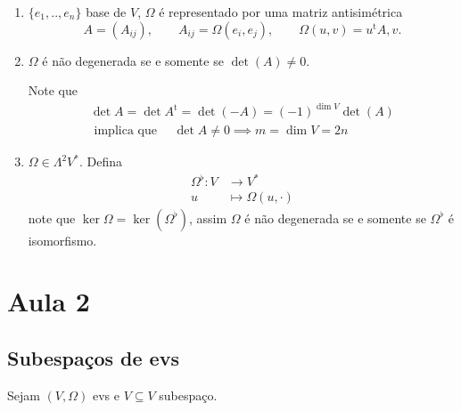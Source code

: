 \begin{remark}\leavevmode 
	\begin{enumerate}
		\item $\{e_1,..,e_{n}\} $ base de $V$, $\Omega$ \'e representado por uma matriz antisim\'etrica
	\[A=(A_{ij}),\qquad A_{ij}=\Omega(e_{i},e_{j}),\qquad \Omega(u,v)=u^{\operatorname{t}} A,v.\]

	\item $\Omega$ \'e n\~ao degenerada se e somente se $\det (A)\neq 0$.

		Note que
		 \begin{align*}\det A=\det A^{\operatorname{t}} =\det (-A)=(-1)^{\dim V}\det (A)\\
			 \text{ implica que }\quad  \det A\neq 0\implies m=\dim V=2n
			 \end{align*}
	
	\item $\Omega\in \Lambda^{2} V^{*}$. Defina
		\begin{align*}
			\Omega^{\flat}: V &\longrightarrow V^{*} \\
			u &\longmapsto \Omega(u,\cdot )
		\end{align*}
		note que $\ker \Omega=\ker (\Omega^{\flat} )$, assim $\Omega$ \'e n\~ao degenerada se e somente se  $\Omega^{\flat}$ \'e isomorfismo.
	\end{enumerate}
	\end{remark}

\section{Aula 2}

\subsection{Subespa\c cos de evs}

Sejam $(V,\Omega)$ evs e $V\subseteq V$ subespa\c co.

